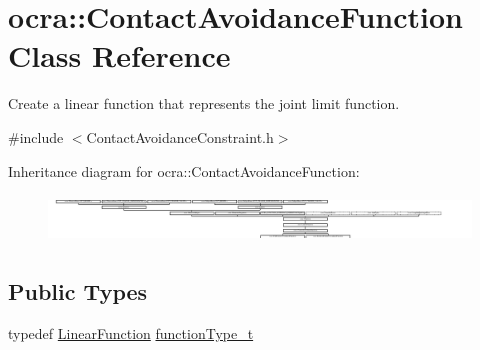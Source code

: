 \hypertarget{classocra_1_1ContactAvoidanceFunction}{}\section{ocra\+:\+:Contact\+Avoidance\+Function Class Reference}
\label{classocra_1_1ContactAvoidanceFunction}


Create a linear function that represents the joint limit function.  




{\ttfamily \#include $<$Contact\+Avoidance\+Constraint.\+h$>$}

Inheritance diagram for ocra\+:\+:Contact\+Avoidance\+Function\+:\begin{figure}[H]
\begin{center}
\leavevmode
\includegraphics[height=1.262480cm]{d4/d45/classocra_1_1ContactAvoidanceFunction}
\end{center}
\end{figure}
\subsection*{Public Types}
\begin{DoxyCompactItemize}
\item 
typedef \hyperlink{classocra_1_1LinearFunction}{Linear\+Function} \hyperlink{classocra_1_1ContactAvoidanceFunction_a15d14e0a9e8810d1a6990d5ab7e179ab}{function\+Type\+\_\+t}
\end{DoxyCompactItemize}
